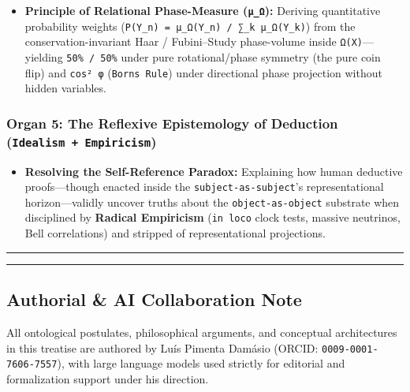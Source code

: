 \documentclass[
]{article}
\providecommand{\tightlist}{%
  \setlength{\itemsep}{0pt}\setlength{\parskip}{0pt}}
\begin{document}
\begin{itemize}
\tightlist
\item
  \textbf{Principle of Relational Phase-Measure (\texttt{μ\_Ω}):}
  Deriving quantitative probability weights
  (\texttt{P(\textquotesingle{}Y\_n)~=~μ\_Ω(\textquotesingle{}Y\_n)~/~∑\_k~μ\_Ω(\textquotesingle{}Y\_k)})
  from the conservation-invariant Haar / Fubini--Study phase-volume
  inside \texttt{Ω(X)}---yielding \texttt{50\%~/~50\%} under pure
  rotational/phase symmetry (the pure coin flip) and \texttt{cos²~φ}
  (\texttt{Born\textquotesingle{}s~Rule}) under directional phase
  projection without hidden variables.
\end{itemize}

\subsubsection{\texorpdfstring{Organ 5: The Reflexive Epistemology of
Deduction
(\texttt{Idealism~+~Empiricism})}{Organ 5: The Reflexive Epistemology of Deduction (Idealism~+~Empiricism)}}\label{organ-5-the-reflexive-epistemology-of-deduction-idealism-empiricism}

\begin{itemize}
\tightlist
\item
  \textbf{Resolving the Self-Reference Paradox:} Explaining how human
  deductive proofs---though enacted inside the
  \texttt{subject-as-subject}'s representational horizon---validly
  uncover truths about the \texttt{object-as-object} substrate when
  disciplined by \textbf{Radical Empiricism} (\texttt{in~loco} clock
  tests, massive neutrinos, Bell correlations) and stripped of
  representational projections.
\end{itemize}

\begin{center}\rule{0.5\linewidth}{0.5pt}\end{center}

\begin{center}\rule{0.5\linewidth}{0.5pt}\end{center}

\subsection{Authorial \& AI Collaboration
Note}\label{authorial-ai-collaboration-note}

All ontological postulates, philosophical arguments, and conceptual
architectures in this treatise are authored by Luís Pimenta Damásio
(ORCID: \texttt{0009-0001-7606-7557}), with large language models used
strictly for editorial and formalization support under his direction.
\end{document}

